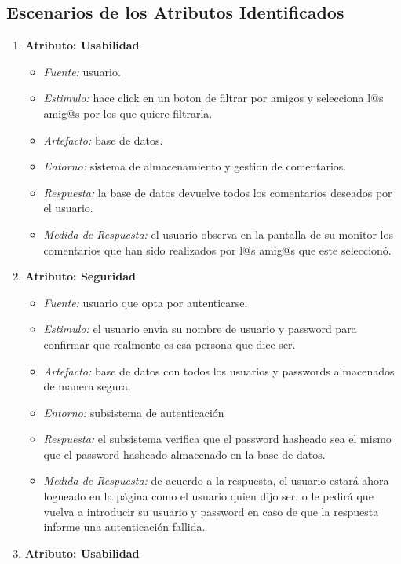 \subsection{Escenarios de los Atributos Identificados}

\begin{enumerate}
\item {\bf Atributo: Usabilidad}
    \begin{itemize}
        \item {\it Fuente:} usuario.
        \item {\it Estimulo:} hace click en un boton de filtrar por amigos y selecciona l@s amig@s por los que quiere filtrarla.
        \item {\it Artefacto:} base de datos.
        \item {\it Entorno:} sistema de almacenamiento y gestion de comentarios.
        \item {\it Respuesta:} la base de datos devuelve todos los comentarios deseados por el usuario.
        \item {\it Medida de Respuesta:} el usuario observa en la pantalla de su monitor los comentarios que han sido realizados por l@s amig@s que este seleccionó.
    \end{itemize}
\item {\bf Atributo: Seguridad}
    \begin{itemize}
        \item {\it Fuente:} usuario que opta por autenticarse.
        \item {\it Estimulo:} el usuario envia su nombre de usuario y password para confirmar que realmente es esa persona que dice ser.
        \item {\it Artefacto:} base de datos con todos los usuarios y passwords almacenados de manera segura.
        \item {\it Entorno:} subsistema de autenticación
        \item {\it Respuesta:} el subsistema verifica que el password hasheado sea el mismo que el password hasheado almacenado en la base de datos.
        \item {\it Medida de Respuesta:} de acuerdo a la respuesta, el usuario estará ahora logueado en la página como el usuario quien dijo ser, o le pedirá que vuelva a introducir su usuario y password en caso de que la respuesta informe una autenticación fallida.
    \end{itemize}
\item {\bf Atributo: Usabilidad}
    \begin{itemize}

\end{itemize}
\end{enumerate}
